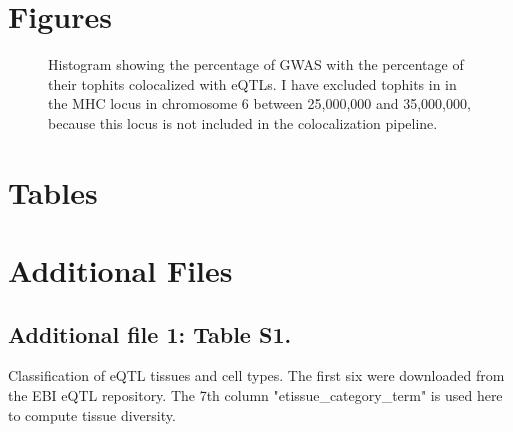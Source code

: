 \documentclass{bmcart}
\begin{document}
\begin{backmatter}


        \section*{Figures}

        \begin{figure}[h!]
            \caption{Histogram showing the percentage of GWAS with the percentage of their tophits colocalized with eQTLs.
            I have excluded tophits in in the MHC locus in chromosome 6 between 25,000,000 and 35,000,000,
                because this locus is not included in the colocalization pipeline.}
            \label{fig:hist_perc_tophits_eqtl_excl_mhc}
        \end{figure}


        \section*{Tables}

        


        \section*{Additional Files}
        \subsection*{Additional file 1: Table S1.}
        Classification of eQTL tissues and cell types. The first six were downloaded from the EBI eQTL repository.
        The 7th column "etissue\_category\_term" is used here to compute tissue diversity.


\end{backmatter}
\end{document}
